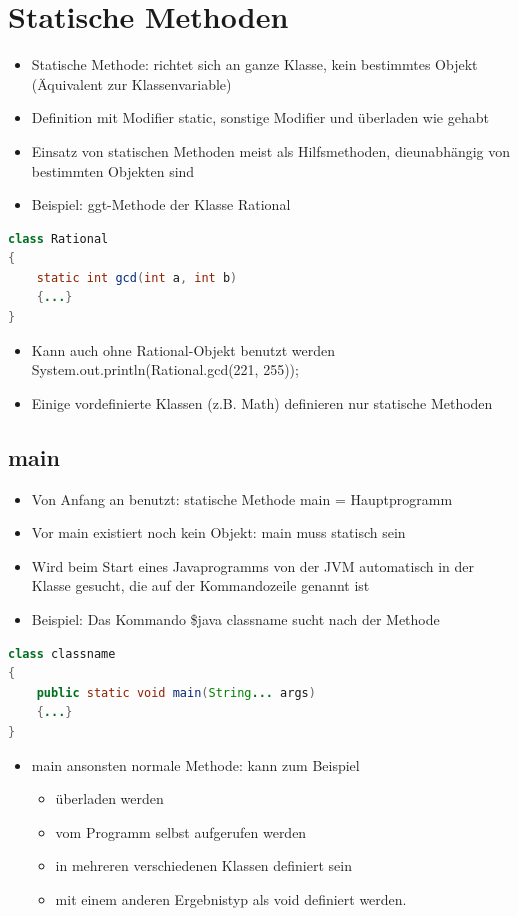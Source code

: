 \section{Statische Methoden}
\begin{itemize}
\item Statische Methode: richtet sich an ganze Klasse, kein bestimmtes Objekt (Äquivalent zur Klassenvariable)
\item Definition mit Modifier static, sonstige Modifier und überladen wie gehabt
\item Einsatz von statischen Methoden meist als Hilfsmethoden, dieunabhängig von bestimmten Objekten sind
\item Beispiel: ggt-Methode der Klasse Rational
\end{itemize}
\begin{lstlisting}[language=JAVA]
class Rational
{
	static int gcd(int a, int b)
	{...}
}
\end{lstlisting}
\begin{itemize}
\item Kann auch ohne Rational-Objekt benutzt werden\\
System.out.println(Rational.gcd(221, 255));
\item Einige vordefinierte Klassen (z.B. Math) definieren nur statische Methoden
\end{itemize}

\subsection{main}
\begin{itemize}
\item Von Anfang an benutzt: statische Methode main = Hauptprogramm
\item Vor main existiert noch kein Objekt: main muss statisch sein
\item Wird beim Start eines Javaprogramms von der JVM automatisch in der Klasse gesucht, die auf der Kommandozeile genannt ist
\item Beispiel: Das Kommando \$java classname sucht nach der Methode
\end{itemize}
\begin{lstlisting}[language=JAVA]
class classname
{
	public static void main(String... args)
	{...}
}
\end{lstlisting}
\begin{itemize}
\item main ansonsten normale Methode: kann zum Beispiel
	\begin{itemize}
	\item überladen werden
	\item vom Programm selbst aufgerufen werden
	\item  in mehreren verschiedenen Klassen definiert sein
	\item mit einem anderen Ergebnistyp als void definiert werden.
	\end{itemize}
\end{itemize}
%
%
%
